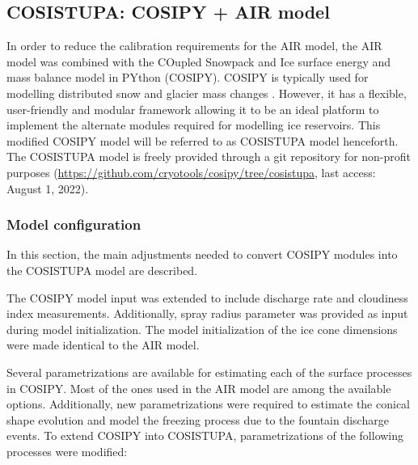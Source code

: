 \subsection{COSISTUPA: COSIPY + AIR model}
\label{sec:Cosistupa}

In order to reduce the calibration requirements for the AIR model, the AIR model was combined with the COupled
Snowpack and Ice surface energy and mass balance model in PYthon (COSIPY). COSIPY is typically used for
modelling distributed snow and glacier mass changes \citep{sauterCOSIPYV1Opensource2020}. However, it has a
flexible, user-friendly and modular framework allowing it to be an ideal platform to implement the alternate
modules required for modelling ice reservoirs. This modified COSIPY model will be referred to as COSISTUPA model
henceforth. The COSISTUPA model is freely provided through a git repository for non-profit purposes
(\url{https://github.com/cryotools/cosipy/tree/cosistupa}, last access: August 1, 2022). 


\subsubsection{Model configuration}

In this section, the main adjustments needed to convert COSIPY modules into the COSISTUPA
model are described.

The COSIPY model input was extended to include discharge rate and cloudiness index measurements. Additionally,
spray radius parameter was provided as input during model initialization. The model initialization of the ice
cone dimensions were made identical to the AIR model.

Several parametrizations are available for estimating each of the surface processes in COSIPY. Most of the ones
used in the AIR model are among the available options. Additionally, new parametrizations were required to
estimate the conical shape evolution and model the freezing process due to the fountain discharge events. To
extend COSIPY into COSISTUPA, parametrizations of the following processes were modified:


